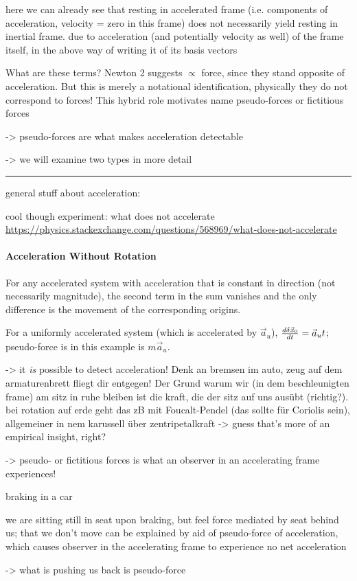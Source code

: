 \documentclass[../class_mech_main.tex]{subfiles}
\begin{document}
here we can already see that resting in accelerated frame (i.e. components of acceleration, velocity = zero in this frame) does not necessarily yield resting in inertial frame. due to acceleration (and potentially velocity as well) of the frame itself, in the above way of writing it of its basis vectors


What are these terms? Newton 2 suggests $\propto$ force, since they stand opposite of acceleration. But this is merely a notational identification, physically they do not correspond to forces! This hybrid role motivates name pseudo-forces or fictitious forces


-> pseudo-forces are what makes acceleration detectable

-> we will examine two types in more detail


\hrule

general stuff about acceleration:

cool though experiment: what does not accelerate \url{https://physics.stackexchange.com/questions/568969/what-does-not-accelerate}



            \paragraph{Acceleration Without Rotation}

For any accelerated system with acceleration that is constant in direction (not necessarily magnitude), the second term in the sum vanishes and the only difference is the movement of the corresponding origins.

For a uniformly accelerated system (which is accelerated by $\vec{a}_u$), $\dv{\delta \vec{x}_0}{t} = \vec{a}_u t$; pseudo-force is in this example is $m \vec{a}_u$.



-> it \emph{is} possible to detect acceleration! Denk an bremsen im auto, zeug auf dem armaturenbrett fliegt dir entgegen! Der Grund warum wir (in dem beschleunigten frame) am sitz in ruhe bleiben ist die kraft, die der sitz auf uns ausübt (richtig?). bei rotation auf erde geht das zB mit Foucalt-Pendel (das sollte für Coriolis sein), allgemeiner in nem karussell über zentripetalkraft -> guess that's more of an empirical insight, right?

-> pseudo- or fictitious forces is what an observer in an accelerating frame experiences!


\begin{ex}[Braking]
	braking in a car

	we are sitting still in seat upon braking, but feel force mediated by seat behind us; that we don't move can be explained by aid of pseudo-force of acceleration, which causes observer in the accelerating frame to experience no net acceleration

	-> what is pushing us back is pseudo-force
\end{ex}
\end{document}
